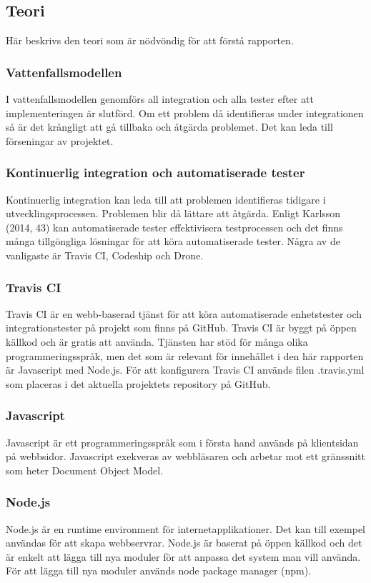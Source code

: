 \subsection{Teori}
Här beskrivs den teori som är nödvöndig för att förstå rapporten.

\subsubsection{Vattenfallsmodellen}
I vattenfallsmodellen genomförs all integration och alla tester efter att implementeringen är slutförd. 
Om ett problem då identifieras under integrationen så är det krångligt att gå tillbaka och åtgärda problemet. 
Det kan leda till förseningar av projektet.

\subsubsection{Kontinuerlig integration och automatiserade tester}
Kontinuerlig integration kan leda till att problemen identifieras tidigare i 
utvecklingsprocessen. Problemen blir då lättare att åtgärda. Enligt Karlsson (2014, 43) kan automatiserade tester effektivisera 
testprocessen och det finns många tillgöngliga lösningar för att köra automatiserade tester. 
Några av de vanligaste är Travis CI, Codeship och Drone.

\subsubsection{Travis CI}
Travis CI är en webb-baserad tjänst för att köra automatiserade enhetstester och integrationstester
på projekt som finns på GitHub. Travis CI är byggt på öppen källkod och är gratis att använda. 
Tjänsten har stöd för många olika programmeringsspråk, men det som är relevant för innehållet i den här rapporten
är Javascript med Node.js. För att konfigurera Travis CI används filen .travis.yml som placeras i det aktuella
projektets repository på GitHub.

\subsubsection{Javascript}
Javascript är ett programmeringsspråk som i första hand används på klientsidan på webbsidor.
Javascript exekveras av webbläsaren och arbetar mot ett gränssnitt som heter Document Object Model.

\subsubsection{Node.js}
Node.js är en runtime environment för internetapplikationer. Det kan till exempel användas för att skapa webbservrar.
Node.js är baserat på öppen källkod och det är enkelt att lägga till nya moduler för att anpassa det system man vill
använda. För att lägga till nya moduler används node package manager (npm).

